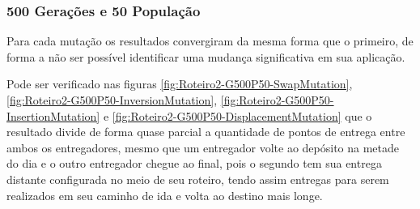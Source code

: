 \subsubsection{500 Gerações e 50 População}

Para cada mutação os resultados convergiram da mesma forma que o primeiro, de forma a não ser possível identificar uma mudança significativa em sua aplicação.

Pode ser verificado nas figuras \ref{fig:Roteiro2-G500P50-SwapMutation}, \ref{fig:Roteiro2-G500P50-InversionMutation}, \ref{fig:Roteiro2-G500P50-InsertionMutation} e \ref{fig:Roteiro2-G500P50-DisplacementMutation} que o resultado divide de forma quase parcial a quantidade de pontos de entrega entre ambos os entregadores,  mesmo que um  entregador volte ao depósito na metade do dia e o outro entregador chegue ao final, pois o segundo tem sua entrega distante configurada no meio de seu roteiro, tendo assim entregas para serem realizados em seu caminho de ida e volta ao destino mais longe.

